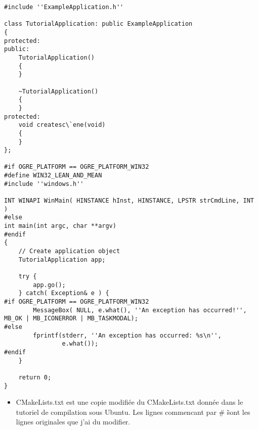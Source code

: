 \documentclass[10pt,a4paper]{report}
\begin{document}
\begin{lstlisting}
#include ''ExampleApplication.h''
 
class TutorialApplication: public ExampleApplication
{
protected:
public:
    TutorialApplication()
    {
    }
 
    ~TutorialApplication()
    {
    }
protected:
    void createsc\`ene(void)
    {
    }
};
 
#if OGRE_PLATFORM == OGRE_PLATFORM_WIN32
#define WIN32_LEAN_AND_MEAN
#include ''windows.h''
 
INT WINAPI WinMain( HINSTANCE hInst, HINSTANCE, LPSTR strCmdLine, INT )
#else
int main(int argc, char **argv)
#endif
{
    // Create application object
    TutorialApplication app;
 
    try {
        app.go();
    } catch( Exception& e ) {
#if OGRE_PLATFORM == OGRE_PLATFORM_WIN32
        MessageBox( NULL, e.what(), ''An exception has occurred!'', MB_OK | MB_ICONERROR | MB_TASKMODAL);
#else
        fprintf(stderr, ''An exception has occurred: %s\n'',
                e.what());
#endif
    }
 
    return 0;
}
\end{lstlisting}



\begin{itemize}
\item CMakeLists.txt est une copie modifi\'ee du CMakeLists.txt donn\'ee dans le tutoriel de compilation sous Ubuntu. Les lignes commencant par \# \~ sont les lignes originales que j'ai du modifier.
\end{itemize}
\end{document}
